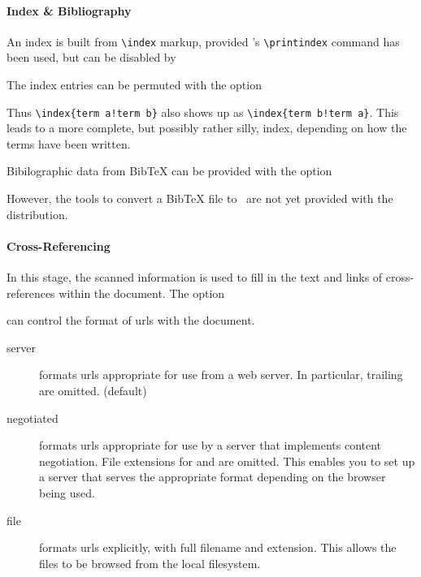 \documentclass{report}
\begin{document}
\paragraph{Index \& Bibliography}
An index is built from \verb|\index| markup, provided 
's \verb|\printindex| command has been used,
but can be disabled by
\begin{quote}
\end{quote}
The index entries can be permuted with the option
\begin{quote}
\end{quote}
Thus \verb|\index{term a!term b}| also shows up as \verb|\index{term b!term a}|.
This leads to a more complete, but possibly rather silly, index,
depending on how the terms have been written.

Bibilographic data from BibTeX can be provided with the option
\begin{quote}
\end{quote}
However, the tools to convert a BibTeX file to \XML\ are
not yet provided with the distribution.

\paragraph{Cross-Referencing}
In this stage, the scanned information is used to fill in the
text and links of cross-references within the document.
The option
\begin{quote}
\end{quote}
can control the format of urls with the document.
\begin{description}
  \item[server] formats urls appropriate for use from a web server.
    In particular, trailing  are omitted. (default)
  \item[negotiated] formats urls appropriate for use by a server
    that implements content negotiation. File extensions for 
    and  are omitted.  This enables you to set up a server
    that serves the appropriate format depending on the browser being used.
  \item[file] formats urls explicitly, with full filename and extension.
    This allows the files to be browsed from the local filesystem.
\end{description}
\end{document}
